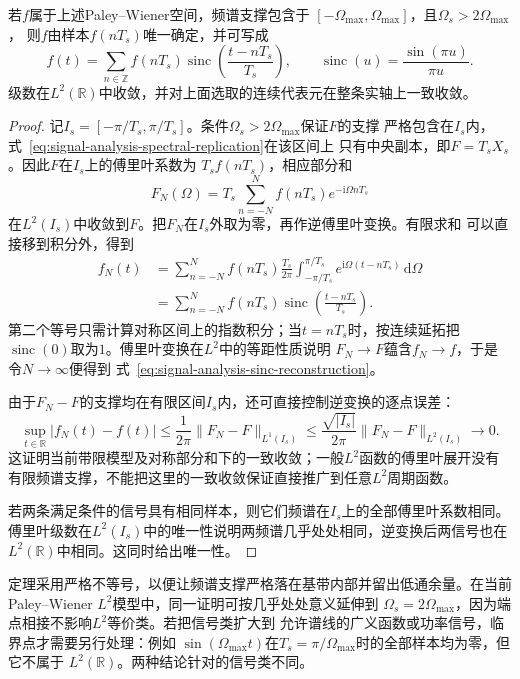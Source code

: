 \begin{theorem}[带限信号的采样重构]
\label{thm:signal-analysis-sampling}
若$f$属于上述Paley--Wiener空间，频谱支撑包含于
$[-\Omega_{\max},\Omega_{\max}]$，且$\Omega_s>2\Omega_{\max}$，
则$f$由样本$f(nT_s)$唯一确定，并可写成
\begin{equation}
  f(t)
  =
  \sum_{n\in\mathbb{Z}}
  f(nT_s)
  \operatorname{sinc}\left(\frac{t-nT_s}{T_s}\right),
  \qquad
  \operatorname{sinc}(u)=\frac{\sin(\pi u)}{\pi u}.
  \label{eq:signal-analysis-sinc-reconstruction}
\end{equation}
级数在$L^2(\mathbb{R})$中收敛，并对上面选取的连续代表元在整条实轴上一致收敛。
\end{theorem}

\begin{proof}
记$I_s=[-\pi/T_s,\pi/T_s]$。条件$\Omega_s>2\Omega_{\max}$保证$F$的支撑
严格包含在$I_s$内，式~\eqref{eq:signal-analysis-spectral-replication}在该区间上
只有中央副本，即$F=T_sX_s$。因此$F$在$I_s$上的傅里叶系数为
$T_sf(nT_s)$，相应部分和
\[
  F_N(\Omega)
  =
  T_s\sum_{n=-N}^{N}
  f(nT_s)e^{-\mathrm{i}\Omega nT_s}
\]
在$L^2(I_s)$中收敛到$F$。把$F_N$在$I_s$外取为零，再作逆傅里叶变换。有限求和
可以直接移到积分外，得到
\begin{align*}
  f_N(t)
  &=
  \sum_{n=-N}^{N}f(nT_s)
  \frac{T_s}{2\pi}
  \int_{-\pi/T_s}^{\pi/T_s}
  e^{\mathrm{i}\Omega(t-nT_s)}\,\mathrm{d}\Omega\\
  &=
  \sum_{n=-N}^{N}f(nT_s)
  \operatorname{sinc}\left(\frac{t-nT_s}{T_s}\right).
\end{align*}
第二个等号只需计算对称区间上的指数积分；当$t=nT_s$时，按连续延拓把
$\operatorname{sinc}(0)$取为$1$。傅里叶变换在$L^2$中的等距性质说明
$F_N\to F$蕴含$f_N\to f$，于是令$N\to\infty$便得到
式~\eqref{eq:signal-analysis-sinc-reconstruction}。

由于$F_N-F$的支撑均在有限区间$I_s$内，还可直接控制逆变换的逐点误差：
\[
  \sup_{t\in\mathbb R}|f_N(t)-f(t)|
  \leq\frac{1}{2\pi}\lVert F_N-F\rVert_{L^1(I_s)}
  \leq\frac{\sqrt{|I_s|}}{2\pi}\lVert F_N-F\rVert_{L^2(I_s)}\longrightarrow0.
\]
这证明当前带限模型及对称部分和下的一致收敛；一般$L^2$函数的傅里叶展开没有
有限频谱支撑，不能把这里的一致收敛保证直接推广到任意$L^2$周期函数。


若两条满足条件的信号具有相同样本，则它们频谱在$I_s$上的全部傅里叶系数相同。
傅里叶级数在$L^2(I_s)$中的唯一性说明两频谱几乎处处相同，逆变换后两信号也在
$L^2(\mathbb{R})$中相同。这同时给出唯一性。
\end{proof}

定理采用严格不等号，以便让频谱支撑严格落在基带内部并留出低通余量。在当前
Paley--Wiener $L^2$模型中，同一证明可按几乎处处意义延伸到
$\Omega_s=2\Omega_{\max}$，因为端点相接不影响$L^2$等价类。若把信号类扩大到
允许谱线的广义函数或功率信号，临界点才需要另行处理：例如
$\sin(\Omega_{\max}t)$在$T_s=\pi/\Omega_{\max}$时的全部样本均为零，但它不属于
$L^2(\mathbb{R})$。两种结论针对的信号类不同。

